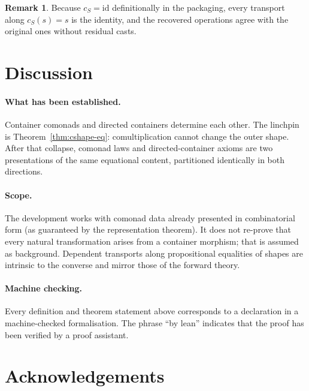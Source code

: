 \documentclass[11pt,a4paper]{article}
\theoremstyle{plain}
\theoremstyle{definition}
\newtheorem{remark}[theorem]{Remark}
\newcommand{\id}{\mathrm{id}}
\begin{document}
\begin{remark}
Because $c_S = \id$ definitionally in the packaging, every transport along
$c_S(s) = s$ is the identity, and the recovered operations agree with the
original ones without residual casts.
\end{remark}

\section{Discussion}

\paragraph{What has been established.}
Container comonads and directed containers determine each other. The linchpin
is Theorem~\ref{thm:cshape-eq}: comultiplication cannot change the outer
shape. After that collapse, comonad laws and directed-container axioms are
two presentations of the same equational content, partitioned identically in
both directions.

\paragraph{Scope.}
The development works with comonad data already presented in combinatorial
form (as guaranteed by the representation theorem). It does not re-prove that
every natural transformation arises from a container morphism; that is
assumed as background. Dependent transports along propositional equalities of
shapes are intrinsic to the converse and mirror those of the forward theory.

\paragraph{Machine checking.}
Every definition and theorem statement above corresponds to a declaration in a
machine-checked formalisation. The phrase ``by lean'' indicates that the proof
has been verified by a proof assistant.

\section*{Acknowledgements}
\end{document}
